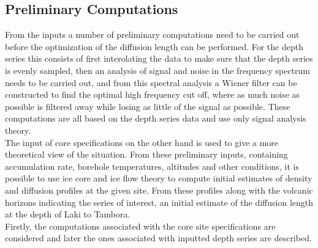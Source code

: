 \documentclass[../../CompleteThesis/Complete_1stDraft.tex]{subfiles}
\begin{document}
\subsection[Preliminary Computations]{Preliminary Computations}
\label{Subsec:Method_FirstSigmaEstimate_PrelimComputations}
From the inputs a number of preliminary computations need to be carried out before the optimization of the diffusion length can be performed. For the depth series this consists of first interolating the data to make sure that the depth series is evenly sampled, then an analysis of signal and noise in the frequency spectrum needs to be carried out, and from this spectral analysis a Wiener filter can be constructed to find the optimal high frequency cut off, where as much noise as possible is filtered away while losing as little of the signal as possible. These computations are all based on the depth series data and use only signal analysis theory.\\
The input of core specifications on the other hand is used to give a more theoretical view of the situation. From these preliminary inputs, containing accumulation rate, borehole temperatures, altitudes and other conditions, it is possible to use ice core and ice flow theory to compute initial estimates of density and diffusion profiles at the given site. From these profiles along with the volcanic horizons indicating the series of interest, an initial estimate of the diffusion length at the depth of Laki to Tambora.\\
Firstly, the computations associated with the core site specifications are considered and later the ones associated with inputted depth series are described. 
 
 
 
\end{document}

